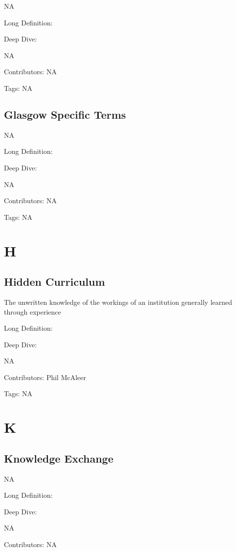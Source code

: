 \documentclass[
  letterpaper,
  DIV=11,
  numbers=noendperiod]{scrreprt}
\begin{document}
NA

Long Definition:

Deep Dive:

NA

Contributors: NA

Tags: NA

\section{Glasgow Specific Terms}\label{glasgow-specific-terms}

NA

Long Definition:

Deep Dive:

NA

Contributors: NA

Tags: NA


\chapter{H}\label{h}

\section{Hidden Curriculum}\label{hidden-curriculum}

The unwritten knowledge of the workings of an institution generally
learned through experience

Long Definition:

Deep Dive:

NA

Contributors: Phil McAleer

Tags: NA


\chapter{K}\label{k}

\section{Knowledge Exchange}\label{knowledge-exchange}

NA

Long Definition:

Deep Dive:

NA

Contributors: NA
\end{document}

